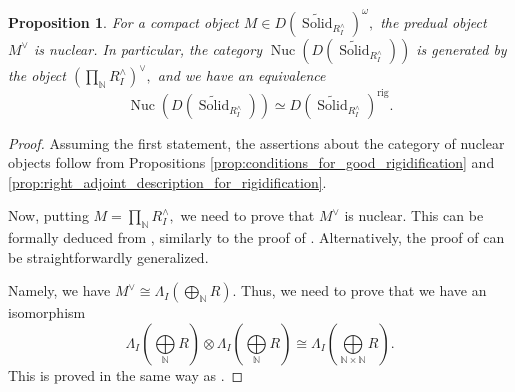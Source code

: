 \documentclass[11pt,leqno]{amsart}
\newtheorem{prop}[theo]{Proposition}
\numberwithin{equation}{section}
\def\N{\mathbb{N}}
\def\wt{\widetilde}
\newcommand{\indlim}[1][]{\mathop{\varinjlim}\limits_{#1}}
\newcommand{\biggplus}[1][]{\mathop{\bigoplus}\limits_{#1}}
\newcommand{\prodd}[1][]{\mathop{\prod}\limits_{#1}}
\newcommand{\rig}{\operatorname{rig}}
\newcommand{\Nuc}{\operatorname{Nuc}}
\newcommand{\Solid}{\operatorname{Solid}}
\newcommand{\Fiber}{\operatorname{Fiber}}
\newcommand{\Kos}{\operatorname{Kos}}
\begin{document}
\begin{prop}\label{prop:good_rigidification_synthetic_solid}
For a compact object $M\in D(\wt{\Solid}_{R^{\wedge}_I})^{\omega},$ the predual object $M^{\vee}$ is nuclear. In particular, the category $\Nuc(D(\wt{\Solid}_{R^{\wedge}_I}))$ is generated by the object $(\prodd[\N]R^{\wedge}_I)^{\vee},$ and we have an equivalence
\begin{equation*}
\Nuc(D(\wt{\Solid}_{R^{\wedge}_I}))\simeq D(\wt{\Solid}_{R^{\wedge}_I})^{\rig}.
\end{equation*}
\end{prop} 

\begin{proof}
Assuming the first statement, the assertions about the category of nuclear objects follow from Propositions \ref{prop:conditions_for_good_rigidification} and \ref{prop:right_adjoint_description_for_rigidification}.

Now, putting $M=\prodd[\N]R^{\wedge}_I,$ we need to prove that $M^{\vee}$ is nuclear. This can be formally deduced from \cite[Satz 3.8]{And23}, similarly to the proof of \cite[Korollar 3.14]{And23}. Alternatively, the proof of \cite[Satz 3.8]{And23} can be straightforwardly generalized.

Namely, we have $M^{\vee}\cong\Lambda_I(\biggplus[\N]R).$ Thus, we need to prove that we have an isomorphism
\begin{equation*}
\Lambda_I(\biggplus[\N]R)\otimes \Lambda_I(\biggplus[\N]R)\cong \Lambda_I(\biggplus[\N\times\N]R).
\end{equation*}
This is proved in the same way as \cite[Satz 3.8]{And23}.
\end{proof}
\end{document}
